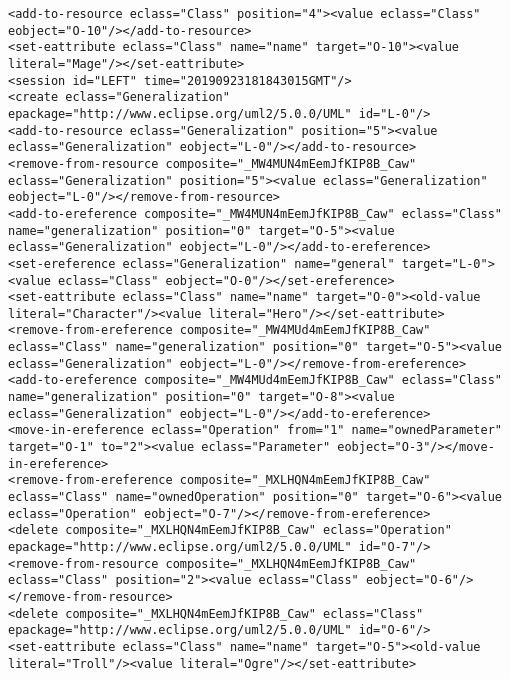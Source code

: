 \begin{lstlisting}[style=cbpfile,caption={Change-based representation of the model in Figure \ref{fig:class_diagram_left}.},label=lst:class_diagram_left_cbpfile]
<add-to-resource eclass="Class" position="4"><value eclass="Class" eobject="O-10"/></add-to-resource>
<set-eattribute eclass="Class" name="name" target="O-10"><value literal="Mage"/></set-eattribute>
<session id="LEFT" time="20190923181843015GMT"/>
<create eclass="Generalization" epackage="http://www.eclipse.org/uml2/5.0.0/UML" id="L-0"/>
<add-to-resource eclass="Generalization" position="5"><value eclass="Generalization" eobject="L-0"/></add-to-resource>
<remove-from-resource composite="_MW4MUN4mEemJfKIP8B_Caw" eclass="Generalization" position="5"><value eclass="Generalization" eobject="L-0"/></remove-from-resource>
<add-to-ereference composite="_MW4MUN4mEemJfKIP8B_Caw" eclass="Class" name="generalization" position="0" target="O-5"><value eclass="Generalization" eobject="L-0"/></add-to-ereference>
<set-ereference eclass="Generalization" name="general" target="L-0"><value eclass="Class" eobject="O-0"/></set-ereference>
<set-eattribute eclass="Class" name="name" target="O-0"><old-value literal="Character"/><value literal="Hero"/></set-eattribute>
<remove-from-ereference composite="_MW4MUd4mEemJfKIP8B_Caw" eclass="Class" name="generalization" position="0" target="O-5"><value eclass="Generalization" eobject="L-0"/></remove-from-ereference>
<add-to-ereference composite="_MW4MUd4mEemJfKIP8B_Caw" eclass="Class" name="generalization" position="0" target="O-8"><value eclass="Generalization" eobject="L-0"/></add-to-ereference>
<move-in-ereference eclass="Operation" from="1" name="ownedParameter" target="O-1" to="2"><value eclass="Parameter" eobject="O-3"/></move-in-ereference>
<remove-from-ereference composite="_MXLHQN4mEemJfKIP8B_Caw" eclass="Class" name="ownedOperation" position="0" target="O-6"><value eclass="Operation" eobject="O-7"/></remove-from-ereference>
<delete composite="_MXLHQN4mEemJfKIP8B_Caw" eclass="Operation" epackage="http://www.eclipse.org/uml2/5.0.0/UML" id="O-7"/>
<remove-from-resource composite="_MXLHQN4mEemJfKIP8B_Caw" eclass="Class" position="2"><value eclass="Class" eobject="O-6"/></remove-from-resource>
<delete composite="_MXLHQN4mEemJfKIP8B_Caw" eclass="Class" epackage="http://www.eclipse.org/uml2/5.0.0/UML" id="O-6"/>
<set-eattribute eclass="Class" name="name" target="O-5"><old-value literal="Troll"/><value literal="Ogre"/></set-eattribute>

\end{lstlisting}
